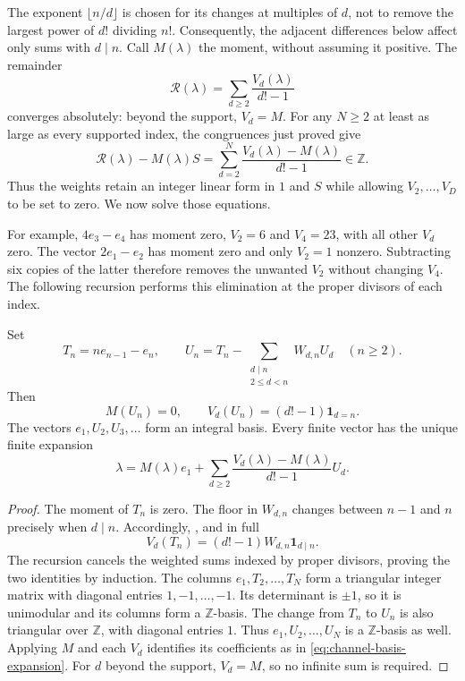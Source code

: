 \documentclass[11pt]{article}
\begin{document}
The exponent $\lfloor n/d\rfloor$ is chosen for its changes at multiples
of $d$, not to remove the largest power of $d!$ dividing $n!$.
Consequently, the adjacent differences below affect only sums with $d\mid n$.
Call $M(\lambda)$ the moment, without assuming it positive. The remainder
\[
\mathcal R(\lambda)=\sum_{d\ge2}\frac{V_d(\lambda)}{d!-1}
\]
converges absolutely: beyond the support, $V_d=M$. For any $N\ge2$ at
least as large as every supported index, the congruences just proved give
\[
\mathcal R(\lambda)-M(\lambda)S
=\sum_{d=2}^N\frac{V_d(\lambda)-M(\lambda)}{d!-1}\in\mathbb Z.
\]
Thus the weights retain an integer linear form in $1$ and $S$ while
allowing $V_2,\ldots,V_D$ to be set to zero. We now solve those equations.

For example, $4e_3-e_4$ has moment zero, $V_2=6$ and $V_4=23$,
with all other $V_d$ zero. The vector $2e_1-e_2$ has moment zero and
only $V_2=1$ nonzero. Subtracting six copies of the latter therefore
removes the unwanted $V_2$ without changing $V_4$. The following recursion
performs this elimination at the proper divisors of each index.

\begin{theorem}\label{res:divisor-channel-coordinates}
Set
\[
T_n=ne_{n-1}-e_n,\qquad
U_n=T_n-\sum_{\substack{d\mid n\\2\le d<n}}W_{d,n}U_d
\quad(n\ge2).
\]
Then
\[
M(U_n)=0,\qquad V_d(U_n)=(d!-1)\mathbf1_{d=n}.
\]
The vectors $e_1,U_2,U_3,\ldots$ form an integral basis.  Every finite vector
has the unique finite expansion
\begin{equation}
\lambda=M(\lambda)e_1+
\sum_{d\ge2}\frac{V_d(\lambda)-M(\lambda)}{d!-1}U_d.
\label{eq:channel-basis-expansion}
\end{equation}
\end{theorem}

\begin{proof}
The moment of $T_n$ is zero.  The floor in $W_{d,n}$ changes between
$n-1$ and $n$ precisely when $d\mid n$. Accordingly,
, and in full
\[
V_d(T_n)=(d!-1)W_{d,n}\mathbf1_{d\mid n}.
\]
The recursion cancels the weighted sums indexed by proper divisors, proving the two identities
by induction. The columns $e_1,T_2,\ldots,T_N$ form a triangular integer
matrix with diagonal entries $1,-1,\ldots,-1$. Its determinant is $\pm1$,
so it is unimodular and its columns form a $\mathbb Z$-basis. The change
from $T_n$ to $U_n$ is also triangular over $\mathbb Z$, with diagonal
entries $1$. Thus $e_1,U_2,\ldots,U_N$ is a $\mathbb Z$-basis as well.  Applying $M$ and each $V_d$ identifies its
coefficients as in \eqref{eq:channel-basis-expansion}.  For $d$ beyond the
support, $V_d=M$, so no infinite sum is required.

\end{proof}
\end{document}
